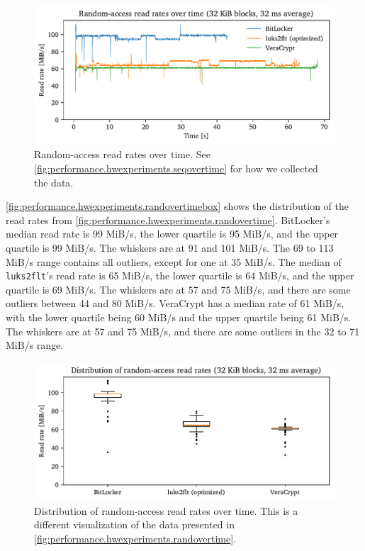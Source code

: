 \begin{figure}[htb!]
	\center
	\includegraphics[scale=1]{../fig/performance.hwexperiments.randovertime.pdf}
	\caption[
		Random-access read rates over time
	]{
		Random-access read rates over time. See \autoref{fig:performance.hwexperiments.seqovertime} for how we collected the data.
	}
	\label{fig:performance.hwexperiments.randovertime}
\end{figure}

\autoref{fig:performance.hwexperiments.randovertimebox} shows the distribution of the read rates from \autoref{fig:performance.hwexperiments.randovertime}. BitLocker's median read rate is 99 MiB/s, the lower quartile is 95 MiB/s, and the upper quartile is 99 MiB/s. The whiskers are at 91 and 101 MiB/s. The 69 to 113 MiB/s range contains all outliers, except for one at 35 MiB/s. The median of \texttt{luks2flt}'s read rate is 65 MiB/s, the lower quartile is 64 MiB/s, and the upper quartile is 69 MiB/s. The whiskers are at 57 and 75 MiB/s, and there are some outliers between 44 and 80 MiB/s. VeraCrypt has a median rate of 61 MiB/s, with the lower quartile being 60 MiB/s and the upper quartile being 61 MiB/s. The whiskers are at 57 and 75 MiB/s, and there are some outliers in the 32 to 71 MiB/s range.

\begin{figure}[htb!]
	\center
	\includegraphics[scale=1]{../fig/performance.hwexperiments.randovertimebox.pdf}
	\caption[
		Distribution of random-access read rates over time
	]{
		Distribution of random-access read rates over time. This is a different visualization of the data presented in \autoref{fig:performance.hwexperiments.randovertime}.
	}
	\label{fig:performance.hwexperiments.randovertimebox}
\end{figure}

